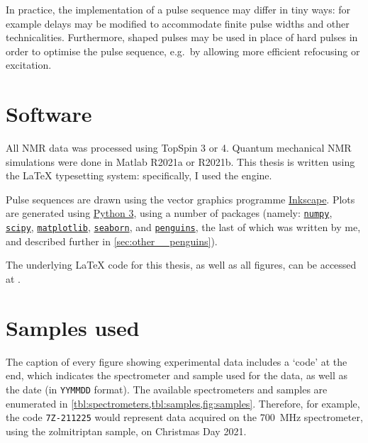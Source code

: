 In practice, the implementation of a pulse sequence may differ in tiny ways: for example delays may be modified to accommodate finite pulse widths and other technicalities.
Furthermore, shaped pulses may be used in place of hard pulses in order to optimise the pulse sequence, e.g.\ by allowing more efficient refocusing or excitation.

\section*{Software}

All NMR data was processed using TopSpin 3 or 4.
Quantum mechanical NMR simulations were done in Matlab R2021a or R2021b.
This thesis is written using the \LaTeX{} typesetting system: specifically, I used the \LuaLaTeX{} engine.

Pulse sequences are drawn using the vector graphics programme \href{https://inkscape.org/}{Inkscape}.
Plots are generated using \href{https://www.python.org/}{Python 3}, using a number of packages (namely: \href{https://github.com/numpy/numpy}{\texttt{numpy}}, \href{https://github.com/scipy/scipy}{\texttt{scipy}}, \href{https://github.com/matplotlib/matplotlib}{\texttt{matplotlib}}, \href{https://github.com/mwaskom/seaborn}{\texttt{seaborn}}, and \href{https://github.com/yongrenjie/penguins}{\texttt{penguins}}, the last of which was written by me, and described further in \cref{sec:other__penguins}).

The underlying \LaTeX{} code for this thesis, as well as all figures, can be accessed at .

\section*{Samples used}

The caption of every figure showing experimental data includes a `code' at the end, which indicates the spectrometer and sample used for the data, as well as the date (in \texttt{YYMMDD} format).
The available spectrometers and samples are enumerated in \cref{tbl:spectrometers,tbl:samples,fig:samples}.
Therefore, for example, the code \texttt{7Z-211225} would represent data acquired on the \SI{700}{\MHz} spectrometer, using the zolmitriptan sample, on Christmas Day 2021.

